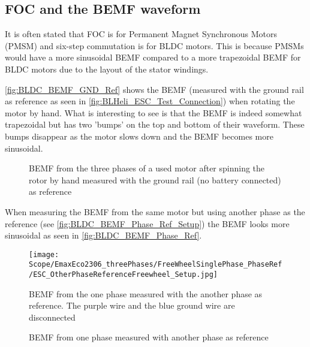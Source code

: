 \subsection{FOC and the BEMF waveform}
It is often stated that FOC is for Permanent Magnet Synchronous Motors (PMSM) and six-step commutation is for BLDC motors. This is because PMSMs would have a more sinusoidal BEMF compared to a more trapezoidal BEMF for BLDC motors due to the layout of the stator windings.

\autoref{fig:BLDC_BEMF_GND_Ref} shows the BEMF (measured with the ground rail as reference as seen in \autoref{fig:BLHeli_ESC_Test_Connection}) when rotating the motor by hand. What is interesting to see is that the BEMF is indeed somewhat trapezoidal but has two 'bumps' on the top and bottom of their waveform. These bumps disappear as the motor slows down and the BEMF becomes more sinusoidal.

\begin{figure}[H]
	\centering
	\hfill
	\caption{BEMF from the three phases of a used motor after spinning the rotor by hand measured with the ground rail (no battery connected) as reference}
	\label{fig:BLDC_BEMF_GND_Ref}
\end{figure}

When measuring the BEMF from the same motor but using another phase as the reference (see \autoref{fig:BLDC_BEMF_Phase_Ref_Setup}) the BEMF looks more sinusoidal as seen in \autoref{fig:BLDC_BEMF_Phase_Ref}.

\begin{figure}[H]
	\centering
	\texttt{[image: Scope/EmaxEco2306\_threePhases/FreeWheelSinglePhase\_PhaseRef/ESC\_OtherPhaseReferenceFreewheel\_Setup.jpg]}
	\caption{BEMF from the one phase measured with the another phase as reference. The purple wire and the blue ground wire are disconnected}
	\label{fig:BLDC_BEMF_Phase_Ref_Setup}
\end{figure} 

\begin{figure}[H]
	\centering
	\hfill
	\caption{BEMF from one phase measured with another phase as reference}
	\label{fig:BLDC_BEMF_Phase_Ref}
\end{figure}

